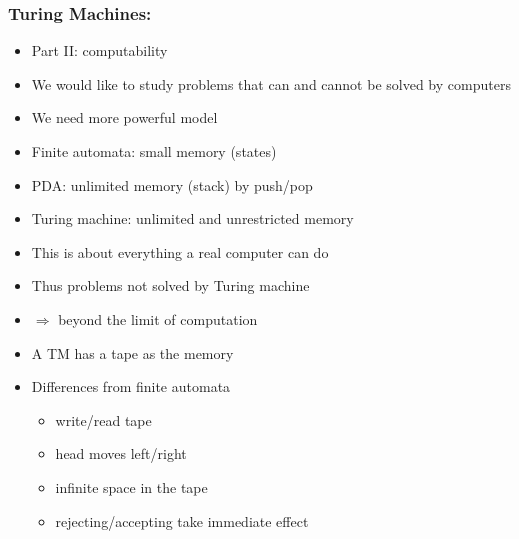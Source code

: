 




\begin{frame}[allowframebreaks]
\frametitle{Turing Machines:}
  \begin{itemize}
\item Part II: computability 
\item [] We would like to study
  problems that can  and cannot be solved by computers
\item We need more powerful model

\item [] Finite automata: small memory (states)

\item [] PDA: unlimited memory (stack) by push/pop
\item Turing machine: unlimited and unrestricted memory

\item This is about everything a real computer can do

\item Thus problems not solved by Turing machine

\item [] $\Rightarrow$ beyond the limit of computation
\item A TM has a tape as the memory

\begin{center}
\end{center}


\item Differences from finite automata
  \begin{itemize}
  \item write/read tape
  \item head moves left/right
  \item infinite space in the tape
  \item rejecting/accepting take immediate effect


\end{itemize}
\end{itemize}
\end{frame}
